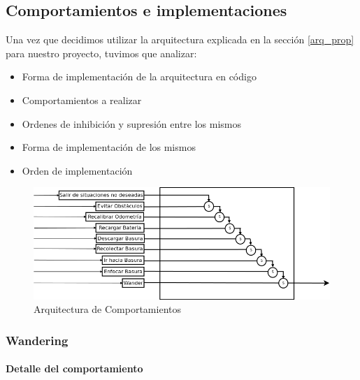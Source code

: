 
\subsection{Comportamientos e implementaciones}
\label{comportamientos}

Una vez que decidimos utilizar la arquitectura explicada en la secci\'on \ref{arq_prop} para nuestro proyecto, tuvimos que analizar:
\begin{itemize}
\item{}Forma de implementaci\'on de la arquitectura en c\'odigo
\item{}Comportamientos a realizar
\item{}Ordenes de inhibici\'on y supresi\'on entre los mismos
\item{}Forma de implementaci\'on de los mismos
\item{}Orden de implementaci\'on
\end{itemize}



\begin{figure}[htp]
\begin{center}
\includegraphics[scale=0.5]{comportamientos/behavioursArchitecture.png}
\caption{Arquitectura de Comportamientos}
\label{fig:architecture}
\end{center}
\end{figure}


\subsubsection{Wandering}
\label{wandering}
\paragraph{Detalle del comportamiento}
